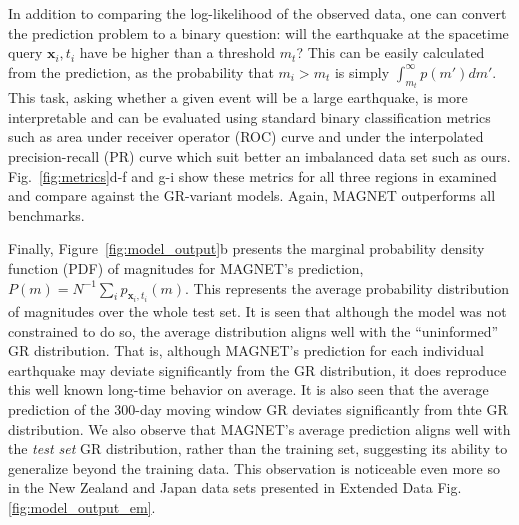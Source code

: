\documentclass[pdflatex]{sn-jnl}
\begin{document}
In addition to comparing the log-likelihood of the observed data, one can convert the prediction problem to a binary question: will the earthquake at the spacetime query $\textbf{x}_i, t_i$ have be higher than a threshold $m_t$? This can be easily calculated from the prediction, as the probability that $m_i>m_t$ is simply $\int_{m_t}^{\infty}p(m')dm'$.
This task, asking whether a given event will be a large earthquake, is more interpretable and can be evaluated using standard binary classification metrics such as area under receiver operator (ROC) curve \cite{Murphy} and under the interpolated precision-recall (PR) curve \cite{buttcher_information_2010} which suit better an imbalanced data set such as ours. Fig.~\ref{fig:metrics}d-f and g-i show these metrics for all three regions in examined and compare against the GR-variant models. Again, MAGNET outperforms all benchmarks.

Finally, Figure~\ref{fig:model_output}b presents the marginal probability density function (PDF) of magnitudes for MAGNET's prediction, $P(m)=N^{-1}\sum_i p_{\textbf{x}_i, t_i}(m)$. This represents the average probability distribution of magnitudes over the whole test set. It is seen that although the model was not constrained to do so, the average distribution aligns well with the ``uninformed'' GR distribution. That is, although MAGNET's prediction for each individual earthquake may deviate significantly from the GR distribution, it does reproduce this well known long-time behavior on average. It is also seen that the average prediction of the 300-day moving window GR deviates significantly from thte GR distribution. We also observe that MAGNET's average prediction aligns well with the \emph{test set} GR distribution, rather than the training set, suggesting its ability to generalize beyond the training data. This observation is noticeable even more so in the New Zealand and Japan data sets presented in Extended Data Fig. \ref{fig:model_output_em}.
\end{document}
